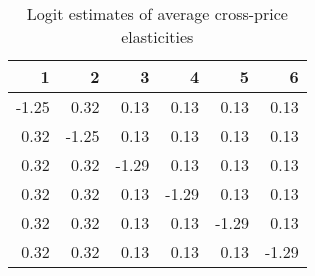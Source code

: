 \begin{table}
\centering
\caption{ Logit estimates of average cross-price elasticities}
\label{tab:logitElasticities}
\begin{tabular}{rrrrrr}
\toprule
    1 &     2 &     3 &     4 &     5 &     6 \\
\midrule
-1.25 &  0.32 &  0.13 &  0.13 &  0.13 &  0.13 \\
 0.32 & -1.25 &  0.13 &  0.13 &  0.13 &  0.13 \\
 0.32 &  0.32 & -1.29 &  0.13 &  0.13 &  0.13 \\
 0.32 &  0.32 &  0.13 & -1.29 &  0.13 &  0.13 \\
 0.32 &  0.32 &  0.13 &  0.13 & -1.29 &  0.13 \\
 0.32 &  0.32 &  0.13 &  0.13 &  0.13 & -1.29 \\
\bottomrule
\end{tabular}
\end{table}
